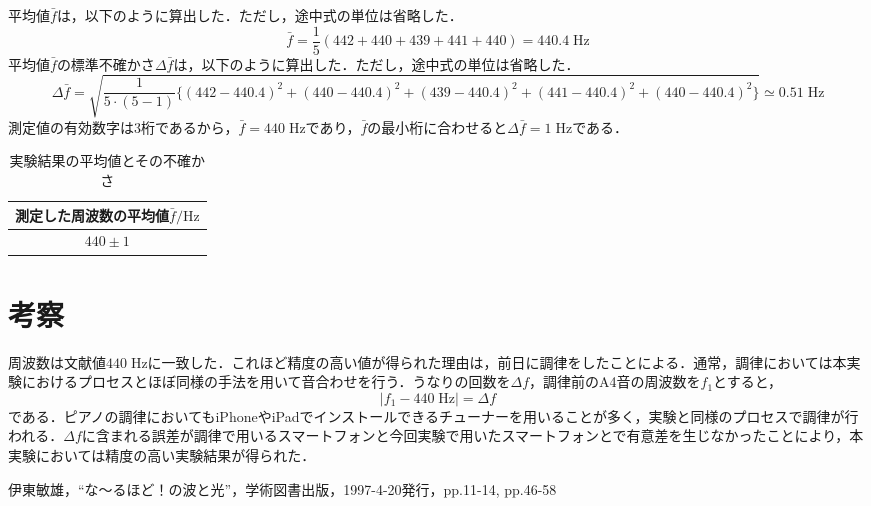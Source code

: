 \documentclass[a4paper, 9pt]{jsarticle}
\newcommand{\ut}[1]{\;\mbox{$\mathrm{#1}$}}
\begin{document}
平均値$\bar{f}$は，以下のように算出した．ただし，途中式の単位は省略した．
\[\bar{f} = \frac{1}{5}(442 + 440 + 439 + 441 + 440) = 440.4 \ut{Hz}\]
平均値$\bar{f}$の標準不確かさ$\Delta \bar{f}$は，以下のように算出した．ただし，途中式の単位は省略した．
\[\Delta \bar{f} = \sqrt{\frac{1}{5\cdot(5-1)}\{(442 - 440.4)^2 + (440 - 440.4)^2 + (439 - 440.4)^2 + (441 - 440.4)^2 + (440 - 440.4)^2\} } \simeq 0.51\ut{Hz}\]
測定値の有効数字は3桁であるから，$\bar{f} = 440\ut{Hz}$であり，$\bar{f}$の最小桁に合わせると$\Delta \bar{f} = 1\ut{Hz}$である．
\begin{table}[H]
  \centering
  \caption{実験結果の平均値とその不確かさ}
  \begin{tabular}{c}
    \hline
    測定した周波数の平均値$\bar{f}/\mathrm{Hz}$ \\
    \hline
    $440 \pm 1$                                 \\
    \hline
  \end{tabular}
  \label{tab2}
\end{table}

\section{考察}
周波数は文献値$440\ut{Hz}$に一致した．これほど精度の高い値が得られた理由は，前日に調律をしたことによる．通常，調律においては本実験におけるプロセスとほぼ同様の手法を用いて音合わせを行う．うなりの回数を$\Delta f$，調律前のA4音の周波数を$f_1$とすると，
\begin{equation}
  |f_1 - 440\ut{Hz}| = \Delta f
\end{equation}
である．ピアノの調律においてもiPhoneやiPadでインストールできるチューナーを用いることが多く，実験と同様のプロセスで調律が行われる．$\Delta f$に含まれる誤差が調律で用いるスマートフォンと今回実験で用いたスマートフォンとで有意差を生じなかったことにより，本実験においては精度の高い実験結果が得られた．


\begin{thebibliography}{99}
   伊東敏雄，“な〜るほど！の波と光”，学術図書出版，1997-4-20発行，pp.11-14, pp.46-58
\end{thebibliography}
\end{document}
